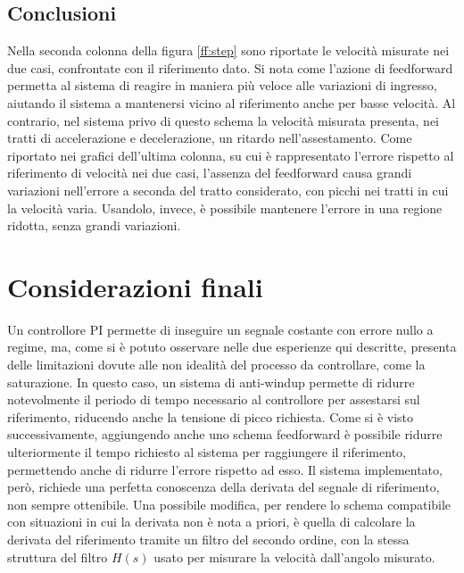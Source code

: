 \documentclass[a4paper, 11pt, Arial]{article}
\begin{document}
\subsection{Conclusioni}
Nella seconda colonna della figura \ref{ff:step} sono riportate le velocità misurate nei due casi, confrontate con il riferimento dato. Si nota come l'azione di feedforward permetta al sistema di reagire in maniera più veloce alle variazioni di ingresso, aiutando il sistema a mantenersi vicino al riferimento anche per basse velocità. Al contrario, nel sistema privo di questo schema la velocità misurata presenta, nei tratti di accelerazione e decelerazione, un ritardo nell'assestamento. Come riportato nei grafici dell'ultima colonna, su cui è rappresentato l'errore rispetto al riferimento di velocità nei due casi, l'assenza del feedforward causa grandi variazioni nell'errore a seconda del tratto considerato, con picchi nei tratti in cui la velocità varia. Usandolo, invece, è possibile mantenere l'errore in una regione ridotta, senza grandi variazioni.

\section{Considerazioni finali}
Un controllore PI permette di inseguire un segnale costante con errore nullo a regime, ma, come si è potuto osservare nelle due esperienze qui descritte, presenta delle limitazioni dovute alle non idealità del processo da controllare, come la saturazione. In questo caso, un sistema di anti-windup permette di ridurre notevolmente il periodo di tempo necessario al controllore per assestarsi sul riferimento, riducendo anche la tensione di picco richiesta. Come si è visto successivamente, aggiungendo anche uno schema feedforward è possibile ridurre ulteriormente il tempo richiesto al sistema per raggiungere il riferimento, permettendo anche di ridurre l'errore rispetto ad esso. Il sistema implementato, però, richiede una perfetta conoscenza della derivata del segnale di riferimento, non sempre ottenibile. Una possibile modifica, per rendere lo schema compatibile con situazioni in cui la derivata non è nota a priori, è quella di calcolare la derivata del riferimento tramite un filtro del secondo ordine, con la stessa struttura del filtro $H(s)$ usato per misurare la velocità dall'angolo misurato.
\end{document}

